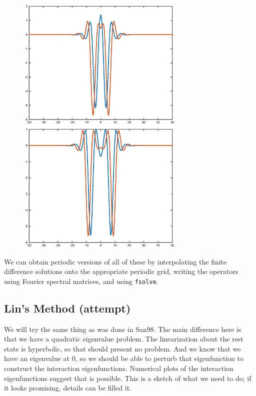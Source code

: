 \documentclass[12pt]{article}
\begin{document}
\begin{figure}[H]
\centering
\includegraphics[width=8cm]{double12_12.eps}
\includegraphics[width=8cm]{double12_34.eps}
\end{figure}

We can obtain periodic versions of all of these by interpolating the finite difference solutions onto the appropriate periodic grid, writing the operators using Fourier spectral matrices, and using \texttt{fsolve}.


\subsection{Lin's Method (attempt)}

We will try the same thing as was done in San98. The main difference here is that we have a quadratic eigenvalue problem. The linearization about the rest state is hyperbolic, so that should present no problem. And we know that we have an eigenvalue at 0, so we should be able to perturb that eigenfunction to construct the interaction eigenfunctions. Numerical plots of the interaction eigenfunctions suggest that is possible. This is a sketch of what we need to do; if it looks promising, details can be filled it.
\end{document}
